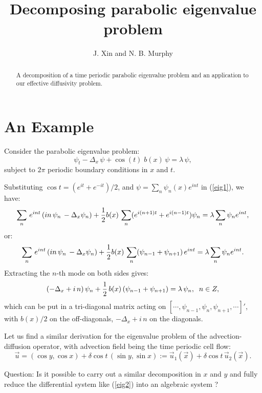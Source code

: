 \documentclass{article}
\newcommand{\no}{\nonumber}
\newcommand{\be}{\begin{equation}}
\newcommand{\ee}{\end{equation}}
\newcommand{\lam}{\mbox{$\lambda$}}
\begin{document}
\title{Decomposing parabolic eigenvalue problem}
\author{J. Xin and N. B. Murphy }
\date{}
\maketitle
\begin{abstract}
A decomposition of a time periodic parabolic eigenvalue problem and an
application to our effective diffusivity problem.

\end{abstract}
\bigskip

\section{An Example}
Consider the parabolic eigenvalue problem:
\be
\psi_t -\Delta_x \, \psi + \cos (t) \; b(x) \, \psi = \lam \, \psi, \label{eig1}
\ee
subject to $2\pi$ periodic boundary conditions in $x$ and $t$. 
\medskip

Substituting $\cos t = (e^{it} + e^{-it})/2$, and $\psi = \sum_{n} \psi_n (x) e^{i n t}$ in (\ref{eig1}), 
we have:
\be
\sum_n \,e^{int}\, (i n \, \psi_n\, - \Delta_x \psi_n) + {1\over 2} b(x)\, \sum_{n} (e^{i(n+1)t} + e^{i(n-1) t}) \psi_n 
= \lam \sum_n \psi_n e^{int}, \no
\ee
or:
\be
 \sum_n \,e^{int}\, (i n \, \psi_n\, - \Delta_x \psi_n)  + {1\over 2} b(x)\, \sum_{n} (\psi_{n-1} + \psi_{n+1}) \, e^{int} 
= \lam \sum_n \psi_n e^{int}. \no
\ee
Extracting the $n$-th mode on both sides gives:
\be
(-\Delta_x + i\, n)\, \psi_n +{1\over 2} \, b(x)\, (\psi_{n-1} + \psi_{n+1}) = \lam \, \psi_n, \;\; n \in Z, \label{eig2}
\ee
which can be put in a tri-diagonal matrix acting on $[\cdots, \psi_{n-1}, \psi_n, \psi_{n+1}, \cdots ]'$,
  with $b(x)/2$ on the off-diagonals, 
$-\Delta_x + i\, n $ on the diagonals.

Let us find a similar derivation for the eigenvalue problem of the 
advection-diffusion operator, with advection field being the time periodic cell flow:
\be \label{eig3}
\vec{u}%
       =(\cos y,\cos x)+\delta\cos t \,(\sin y,\sin x)
       :=\vec{u}_1(\vec{x})+\delta\cos{t}\,\vec{u}_2(\vec{x}). 
\ee

Question: Is it possible to carry out a similar decomposition in $x$ and $y$ and fully reduce the 
differential system like (\ref{eig2}) into an algebraic system ?

%
\end{document}
